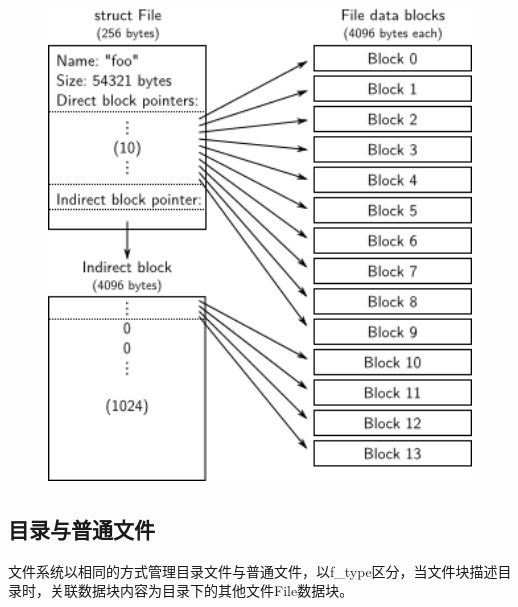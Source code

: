 \documentclass[a4paper,12pt]{report}
\begin{document}
\begin{figure}[H]
	\centering
	\includegraphics [width=1.0\textwidth]{figure//image151.png}
\end{figure}

\subsection{	目录与普通文件}
文件系统以相同的方式管理目录文件与普通文件，以f\_type区分，当文件块描述目录时，关联数据块内容为目录下的其他文件File数据块。
\end{document}
